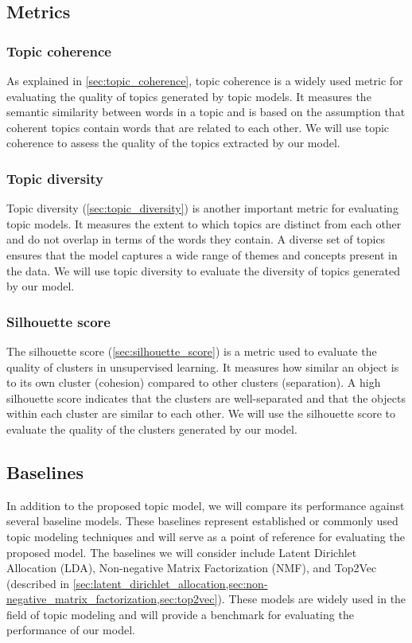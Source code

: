 \subsection{Metrics}
\subsubsection{Topic coherence}
As explained in \cref{sec:topic_coherence}, topic coherence is a widely used metric for evaluating the quality of topics generated by topic models. It measures the semantic similarity between words in a topic and is based on the assumption that coherent topics contain words that are related to each other. We will use topic coherence to assess the quality of the topics extracted by our model.

\subsubsection{Topic diversity}
Topic diversity (\cref{sec:topic_diversity}) is another important metric for evaluating topic models. It measures the extent to which topics are distinct from each other and do not overlap in terms of the words they contain. A diverse set of topics ensures that the model captures a wide range of themes and concepts present in the data. We will use topic diversity to evaluate the diversity of topics generated by our model.

\subsubsection{Silhouette score}
The silhouette score (\cref{sec:silhouette_score}) is a metric used to evaluate the quality of clusters in unsupervised learning. It measures how similar an object is to its own cluster (cohesion) compared to other clusters (separation). A high silhouette score indicates that the clusters are well-separated and that the objects within each cluster are similar to each other. We will use the silhouette score to evaluate the quality of the clusters generated by our model.

\subsection{Baselines}
In addition to the proposed topic model, we will compare its performance against several baseline models. These baselines represent established or commonly used topic modeling techniques and will serve as a point of reference for evaluating the proposed model. The baselines we will consider include Latent Dirichlet Allocation (LDA), Non-negative Matrix Factorization (NMF), and Top2Vec (described in \cref{sec:latent_dirichlet_allocation,sec:non-negative_matrix_factorization,sec:top2vec}). These models are widely used in the field of topic modeling and will provide a benchmark for evaluating the performance of our model.

